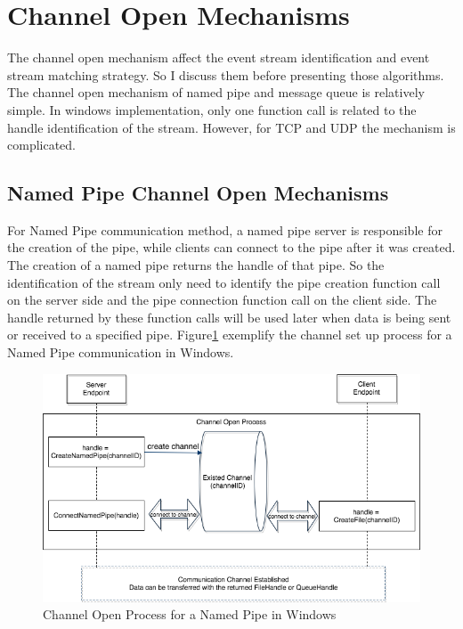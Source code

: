 \section{Channel Open Mechanisms}\label{mecha}
The channel open mechanism affect the event stream identification and event stream matching strategy. So I discuss them before presenting those algorithms. The channel open mechanism of named pipe and message queue is relatively simple. In windows implementation, only one function call is related to the handle identification of the stream. However, for TCP and UDP the mechanism is complicated.

\subsection{Named Pipe Channel Open Mechanisms} 
For Named Pipe communication method, a named pipe server is responsible for the creation of the pipe, while clients can connect to the pipe after it was created. The creation of a named pipe returns the handle of that pipe. So the identification of the stream only need to identify the pipe creation function call on the server side and the pipe connection function call on the client side. The handle returned by these function calls will be used later when data is being sent or received to a specified pipe. Figure\ref{namedpipeopen} exemplify the channel set up process for a Named Pipe communication in Windows. 

\begin{figure}[H]
\centerline{\includegraphics[scale=0.5]{Figures/namepipechannelopen}}
 \caption{Channel Open Process for a Named Pipe in Windows}
\label{namedpipeopen}
\end{figure}
    

